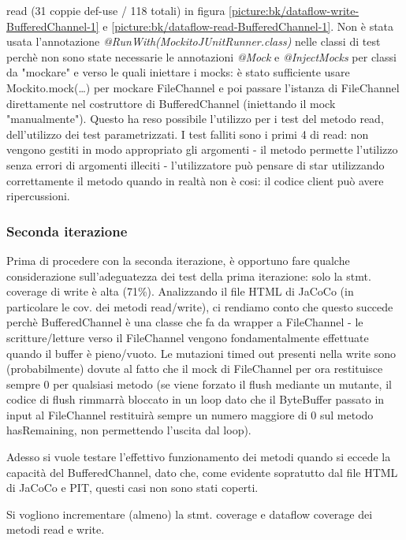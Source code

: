\documentclass[10pt, a4paper]{article}
\newcommand{\getpicturelabel}[1]{picture:#1}
\begin{document}
	read (31 coppie def-use / 118 totali) in figura 
	\ref{\getpicturelabel{bk/dataflow-write-BufferedChannel-1}} e 
	\ref{\getpicturelabel{bk/dataflow-read-BufferedChannel-1}}.
	Non è stata usata l'annotazione \textit{@RunWith(MockitoJUnitRunner.class)} nelle classi di test perchè
	non sono state necessarie le annotazioni \textit{@Mock} e \textit{@InjectMocks} per classi da "mockare" e
	verso le quali iniettare i mocks: è stato sufficiente usare Mockito.mock(\dots) per mockare FileChannel e poi
	passare l'istanza di FileChannel direttamente nel costruttore di BufferedChannel 
	(iniettando il mock "manualmente"). 
	Questo ha reso possibile l'utilizzo per i test del metodo read, dell'utilizzo dei test parametrizzati.
	I test falliti sono i primi 4 di read: non vengono gestiti in modo appropriato gli argomenti - il metodo
	permette l'utilizzo senza errori di argomenti illeciti - l'utilizzatore può pensare di star utilizzando
	correttamente il metodo quando in realtà non è cosi: il codice client può avere ripercussioni.
	
	\subsubsection{Seconda iterazione}
	Prima di procedere con la seconda iterazione, è opportuno fare qualche considerazione sull'adeguatezza
	dei test della prima iterazione: solo la stmt. coverage di write è alta (71\%).
	Analizzando il file HTML di JaCoCo (in particolare le cov. dei metodi read/write), ci rendiamo conto che
	questo succede perchè BufferedChannel
	è una classe che fa da wrapper a FileChannel - le scritture/letture verso il FileChannel vengono fondamentalmente
	effettuate quando il buffer è pieno/vuoto. Le mutazioni timed out presenti nella write
	sono (probabilmente) 
	dovute al fatto che il mock di FileChannel per ora restituisce sempre 0 per qualsiasi metodo (se viene
	forzato il flush mediante un mutante, il codice di flush rimmarrà bloccato in un loop dato che 
	il ByteBuffer passato in input al FileChannel
	restituirà sempre un numero maggiore di 0 sul metodo hasRemaining, 
	non permettendo l'uscita dal loop).
	
	Adesso si vuole testare l'effettivo funzionamento dei metodi quando si eccede la capacità del BufferedChannel,
	dato che, come evidente sopratutto dal file HTML di JaCoCo e PIT, questi casi non sono stati coperti.
	
	Si vogliono incrementare (almeno) la stmt. coverage e dataflow coverage dei metodi read e write.
	
\end{document}
